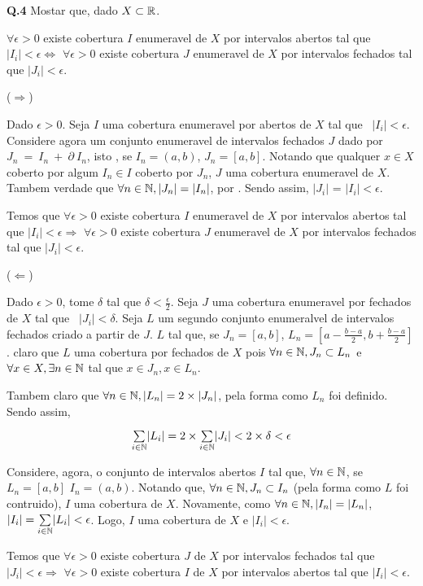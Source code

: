\textbf{Q.4} Mostar que, dado $X \subset \mathbb{R}$.

$\forall \epsilon > 0$ existe cobertura $I$ enumeravel de $X$ por intervalos abertos tal que \series{\N} $|I_i| < \epsilon \iff$ $\forall \epsilon > 0$ existe cobertura $J$ enumeravel de $X$ por intervalos fechados tal que \series{\N} $|J_i| < \epsilon$.

($\Rightarrow$)

Dado $\epsilon > 0$. Seja $I$ uma cobertura enumeravel por abertos de $X$ tal que \mbox{\series{\N}~$|I_i| < \epsilon$}. Considere agora um conjunto enumeravel de intervalos fechados $J$ dado por $J_n~=~I_n~+~\partial~I_n$, isto \eh, se $I_n = (a,b)$, \entao $J_n = [a,b]$. Notando que qualquer $x\in X$ coberto por algum $I_n \in I$ \eh \tambem coberto por $J_n$, \entao $J$ \eh uma cobertura enumeravel de $X$. Tambem \eh verdade que $\forall n \in \mathbb{N}, |J_n| = |I_n|$, por . Sendo assim, \series{\N} $|J_i|$ = \series{\N} $|I_i| < \epsilon$.

Temos \entao que $\forall \epsilon > 0$ existe cobertura $I$ enumeravel de $X$ por intervalos abertos tal que \series{\N} $|I_i| < \epsilon \Rightarrow$ $\forall \epsilon > 0$ existe cobertura $J$ enumeravel de $X$ por intervalos fechados tal que \series{\N} $|J_i| < \epsilon$.

($\Leftarrow$)

Dado $\epsilon > 0$, tome $\delta$ tal que $\delta < \frac{\epsilon}{2}$. Seja $J$ uma cobertura enumeravel por fechados de $X$ tal que \series{\N}~$|J_i| < \delta$. Seja $L$ um segundo conjunto enumeralvel de intervalos fechados criado a partir de $J$. $L$ \eh tal que, se $J_n = [a,b]$, \entao $L_n = [a-\frac{b-a}{2}, b + \frac{b-a}{2}]$. \Eh claro que $L$ \tambem \eh uma cobertura por fechados de $X$ pois $\forall n \in \mathbb{N}, J_n \subset L_n$ e $\forall x \in X, \exists n \in \mathbb{N}$ tal que $x \in J_n, x \in L_n$.

Tambem \eh claro que $\forall n \in \mathbb{N}, |L_n| = 2\times |J_n|$, pela forma como $L_n$ foi definido. Sendo assim, 

$$\mbox{$\sum\limits_{i \in \mathbb{N}}$} |L_i| = 2\times\mbox{$\sum\limits_{i \in \mathbb{N}}$} |J_i| < 2\times \delta < \epsilon$$

Considere, agora, o conjunto \enumeravel de intervalos abertos $I$ tal que, $\forall n \in \mathbb{N}$, se $L_n = [a,b]$ \entao $I_n = (a,b)$. Notando que, $\forall n \in \mathbb{N}, J_n \subset I_n$ (pela forma como $L$ foi contruido), $I$ \tambem \eh uma cobertura de $X$. Novamente, como $\forall n \in \mathbb{N}, |I_n| = |L_n|$, \entao \series{\N}$|I_i| = \mbox{$\sum\limits_{i \in \mathbb{N}}$}|L_i| < \epsilon$. Logo, $I$ \eh uma cobertura \enumeravel de $X$ e \series{\N}$|I_i| < \epsilon$.

Temos \entao que $\forall \epsilon > 0$ existe cobertura $J$ \enumeravel de $X$ por intervalos fechados tal que \series{\N} $|J_i| < \epsilon \Rightarrow$ $\forall \epsilon > 0$ existe cobertura $I$ \enumeravel de $X$ por intervalos abertos tal que \series{\N} $|I_i| < \epsilon$.

